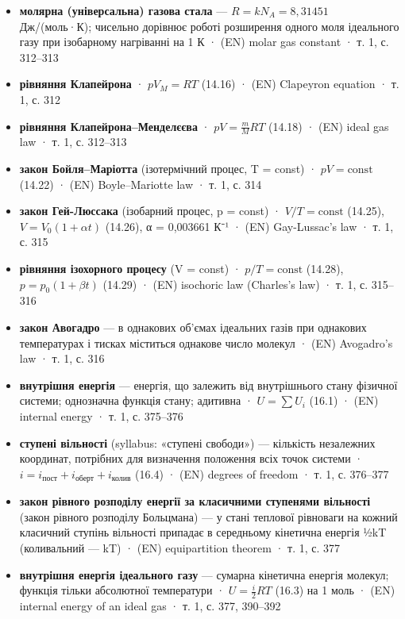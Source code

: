 \documentclass[11pt,a4paper,oneside]{book}
\newcommand{\book}{}
\begin{document}
\begin{itemize}
\item \textbf{молярна (універсальна) газова стала} — $R = kN_A = 8{,}31451$ Дж/(моль·К); чисельно дорівнює роботі розширення одного моля ідеального газу при ізобарному нагріванні на 1 К · (EN) molar gas constant · \book{} т. 1, с. 312–313
\item \textbf{рівняння Клапейрона} · $pV_M = RT$ (14.16) · (EN) Clapeyron equation · \book{} т. 1, с. 312
\item \textbf{рівняння Клапейрона–Менделєєва} · $pV = \tfrac mM RT$ (14.18) · (EN) ideal gas law · \book{} т. 1, с. 312–313
\item \textbf{закон Бойля–Маріотта} (ізотермічний процес, T = const) · $pV = \text{const}$ (14.22) · (EN) Boyle–Mariotte law · \book{} т. 1, с. 314
\item \textbf{закон Гей-Люссака} (ізобарний процес, p = const) · $V/T = \text{const}$ (14.25), $V = V_0(1+\alpha t)$ (14.26), α = 0,003661 К⁻¹ · (EN) Gay-Lussac's law · \book{} т. 1, с. 315
\item \textbf{рівняння ізохорного процесу} (V = const) · $p/T = \text{const}$ (14.28), $p = p_0(1+\beta t)$ (14.29) · (EN) isochoric law (Charles's law) · \book{} т. 1, с. 315–316
\item \textbf{закон Авогадро} — в однакових об'ємах ідеальних газів при однакових температурах і тисках міститься однакове число молекул · (EN) Avogadro's law · \book{} т. 1, с. 316
\item \textbf{внутрішня енергія} — енергія, що залежить від внутрішнього стану фізичної системи; однозначна функція стану; адитивна · $U = \sum U_i$ (16.1) · (EN) internal energy · \book{} т. 1, с. 375–376
\item \textbf{ступені вільності} (syllabus: «ступені свободи») — кількість незалежних координат, потрібних для визначення положення всіх точок системи · $i = i_{\text{пост}}+i_{\text{оберт}}+i_{\text{колив}}$ (16.4) · (EN) degrees of freedom · \book{} т. 1, с. 376–377
\item \textbf{закон рівного розподілу енергії за класичними ступенями вільності} (закон рівного розподілу Больцмана) — у стані теплової рівноваги на кожний класичний ступінь вільності припадає в середньому кінетична енергія ½kT (коливальний — kT) · (EN) equipartition theorem · \book{} т. 1, с. 377
\item \textbf{внутрішня енергія ідеального газу} — сумарна кінетична енергія молекул; функція тільки абсолютної температури · $U = \tfrac i2RT$ (16.3) на 1 моль · (EN) internal energy of an ideal gas · \book{} т. 1, с. 377, 390–392
\end{itemize}
\end{document}
